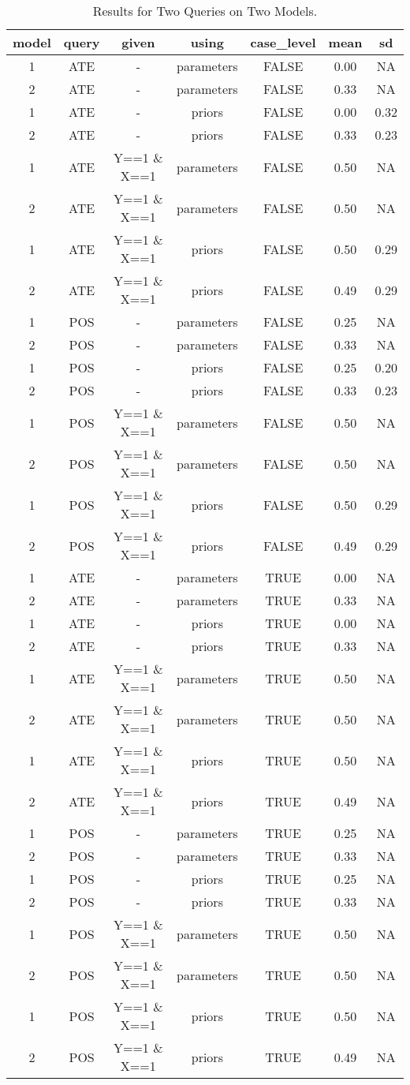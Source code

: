 \documentclass[
  11pt,
  article]{jss}
\begin{document}
\hypertarget{tbl-batch-query}{}
\begin{longtable}{ccccccc}
\caption{\label{tbl-batch-query}Results for Two Queries on Two Models. }\tabularnewline

\toprule
model & query & given & using & case\_level & mean & sd\\
\midrule
1 & ATE & - & parameters & FALSE & 0.00 & NA\\
2 & ATE & - & parameters & FALSE & 0.33 & NA\\
1 & ATE & - & priors & FALSE & 0.00 & 0.32\\
2 & ATE & - & priors & FALSE & 0.33 & 0.23\\
1 & ATE & Y==1 \& X==1 & parameters & FALSE & 0.50 & NA\\
2 & ATE & Y==1 \& X==1 & parameters & FALSE & 0.50 & NA\\
1 & ATE & Y==1 \& X==1 & priors & FALSE & 0.50 & 0.29\\
2 & ATE & Y==1 \& X==1 & priors & FALSE & 0.49 & 0.29\\
1 & POS & - & parameters & FALSE & 0.25 & NA\\
2 & POS & - & parameters & FALSE & 0.33 & NA\\
1 & POS & - & priors & FALSE & 0.25 & 0.20\\
2 & POS & - & priors & FALSE & 0.33 & 0.23\\
1 & POS & Y==1 \& X==1 & parameters & FALSE & 0.50 & NA\\
2 & POS & Y==1 \& X==1 & parameters & FALSE & 0.50 & NA\\
1 & POS & Y==1 \& X==1 & priors & FALSE & 0.50 & 0.29\\
2 & POS & Y==1 \& X==1 & priors & FALSE & 0.49 & 0.29\\
1 & ATE & - & parameters & TRUE & 0.00 & NA\\
2 & ATE & - & parameters & TRUE & 0.33 & NA\\
1 & ATE & - & priors & TRUE & 0.00 & NA\\
2 & ATE & - & priors & TRUE & 0.33 & NA\\
1 & ATE & Y==1 \& X==1 & parameters & TRUE & 0.50 & NA\\
2 & ATE & Y==1 \& X==1 & parameters & TRUE & 0.50 & NA\\
1 & ATE & Y==1 \& X==1 & priors & TRUE & 0.50 & NA\\
2 & ATE & Y==1 \& X==1 & priors & TRUE & 0.49 & NA\\
1 & POS & - & parameters & TRUE & 0.25 & NA\\
2 & POS & - & parameters & TRUE & 0.33 & NA\\
1 & POS & - & priors & TRUE & 0.25 & NA\\
2 & POS & - & priors & TRUE & 0.33 & NA\\
1 & POS & Y==1 \& X==1 & parameters & TRUE & 0.50 & NA\\
2 & POS & Y==1 \& X==1 & parameters & TRUE & 0.50 & NA\\
1 & POS & Y==1 \& X==1 & priors & TRUE & 0.50 & NA\\
2 & POS & Y==1 \& X==1 & priors & TRUE & 0.49 & NA\\
\bottomrule
\end{longtable}
\end{document}
